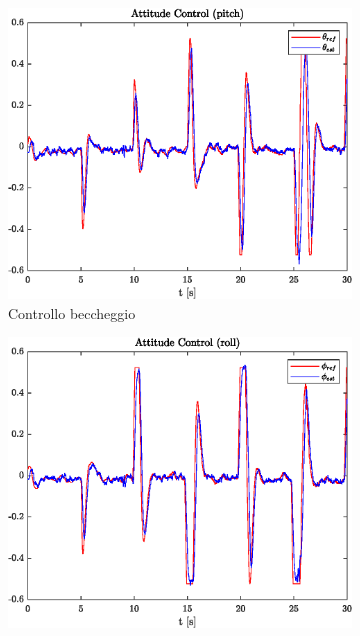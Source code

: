 \begin{figure}
	\centering
	\begin{subfigure}{0.45\textwidth}
		\centering
		\includegraphics[width=1\textwidth]{Simulazioni/Figure/SMC/BUTTERFLY/AttitudeControlPitch}
		\caption{Controllo beccheggio}
	\end{subfigure}
	\hfill
	\begin{subfigure}{0.45\textwidth}
		\centering
		\includegraphics[width=1\textwidth]{Simulazioni/Figure/SMC/BUTTERFLY/AttitudeControlRoll}

\end{subfigure}
\end{figure}
